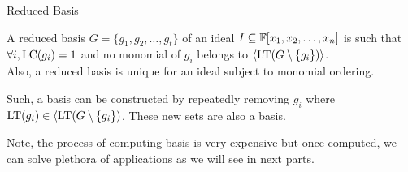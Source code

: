 \documentclass[aspectratio=169, handout, 10pt, hyperref=colorlinks]{beamer}
\begin{document}
\begin{frame}{Reduced \Grob Basis}
    \begin{defn}
    A reduced \Grob basis $G = \{g_1, g_2, \ldots, g_t\}$ of an ideal $I\subseteq\mathbb{F}[x_1, x_2, \ldots, x_n]$ is such that $\forall i, \operatorname{LC}(g_i)=1$ and no monomial of $g_i$ belongs to $\langle \operatorname{LT}(G\setminus\{g_i\})\rangle$.\\
    Also, a reduced \Grob basis is unique for an ideal subject to monomial ordering.
\end{defn}
Such, a \Grob basis can be constructed by repeatedly removing $g_i$ where $\operatorname{LT}(g_i)\in\langle \operatorname{LT}(G\setminus\{g_i\})$. These new sets are also a \Grob basis.

Note, the process of computing \Grob basis is very expensive but once computed, we can solve plethora of applications as we will see in next parts.
\end{frame}
\end{document}
